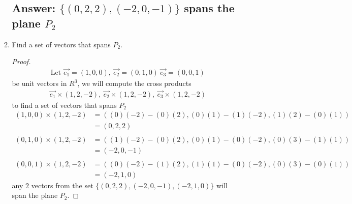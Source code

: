 \documentclass[12pt]{article}
\begin{document}
\begin{enumerate}
\begin{enumerate}
                            \subsection{Answer: $\{(0, 2, 2) , (-2, 0, -1)\}$ spans the plane $P_2$}
                      \item Find a set of vectors that spans $P_2$.
                            \begin{proof}
                                    \begin{align*}
                                            \textrm{Let }\vec{e_1} = (1, 0, 0),\ \vec{e_2} = (0, 1, 0)\ \vec{e_3} = (0, 0, 1)
                                    \end{align*}
                                    be unit vectors in $R^3$, we will compute the cross products
                                    \begin{align*}
                                            \vec{e_1} \times (1, 2, -2),\ \vec{e_2} \times (1, 2, -2),\ \vec{e_3} \times (1, 2, -2)
                                    \end{align*}
                                    to find a set of vectors that spans $P_2$
                                    \begin{align*}
                                            (1,0,0) \times (1, 2, -2) & = ( (0)(-2) - (0)(2), (0)(1)-(1)(-2), (1)(2)-(0)(1) ) \\
                                                                      & = (0, 2, 2)                                           \\\\
                                            (0,1,0) \times (1, 2, -2) & = ( (1)(-2) - (0)(2), (0)(1)-(0)(-2), (0)(3)-(1)(1) ) \\
                                                                      & = (-2, 0, -1)                                         \\\\
                                            (0,0,1) \times (1, 2, -2) & = ( (0)(-2) - (1)(2), (1)(1)-(0)(-2), (0)(3)-(0)(1) ) \\
                                                                      & = (-2, 1, 0)
                                    \end{align*}
                                    any $2$ vectors from the set $\{(0, 2, 2) , (-2, 0, -1), (-2, 1, 0)\}$ will span the plane $P_2$.
                            \end{proof}
                            \pagebreak

\end{enumerate}
\end{enumerate}
\end{document}
